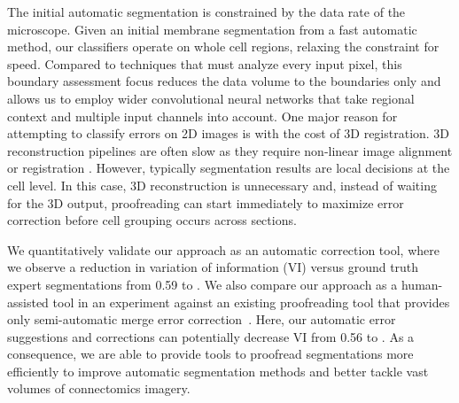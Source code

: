 The initial automatic segmentation is constrained by the data rate of the microscope. Given an initial membrane segmentation from a fast automatic method, our classifiers operate on whole cell regions, relaxing the constraint for speed. Compared to techniques that must analyze every input pixel, this boundary assessment focus reduces the data volume to the boundaries only and allows us to employ wider convolutional neural networks that take regional context and multiple input channels into account. One major reason for attempting to classify errors on 2D images is with the cost of 3D registration. 3D reconstruction pipelines are often slow as they require non-linear image alignment or registration \cite{akselrod09,Saalfeld2010Asrigidaspossible}. However, typically segmentation results are local decisions at the cell level. In this case, 3D reconstruction is unnecessary and, instead of waiting for the 3D output, proofreading can start immediately to maximize error correction before cell grouping occurs across sections.

We quantitatively validate our approach as an automatic correction tool, where we observe a reduction in variation of information (VI) versus ground truth expert segmentations from 0.59 to . We also compare our approach as a human-assisted tool in an experiment against an existing proofreading tool that provides only semi-automatic merge error correction~\cite{haehn_dojo_2014}. Here, our automatic error suggestions and corrections can potentially decrease VI from 0.56 to . As a consequence, we are able to provide tools to proofread segmentations more efficiently to improve automatic segmentation methods and better tackle vast volumes of connectomics imagery.

%
%
